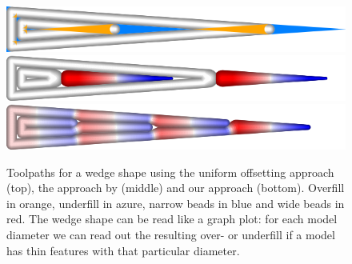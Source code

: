 \begin{figure}\centering
\includegraphics[width=\columnwidth]{sources-intro-TEST-naive-accuracy.png}
\includegraphics[width=\columnwidth]{sources-intro-TEST-Center-widths.png}
\includegraphics[width=\columnwidth]{sources-intro-TEST-InwardDistributed-widths.png}
\caption{
Toolpaths for a wedge shape using the uniform offsetting approach (top), the approach by \citeauthor{Jin2017JMS}(middle) and our approach (bottom).
Overfill in orange, underfill in azure, narrow beads in blue and wide beads in red.
The wedge shape can be read like a graph plot: for each model diameter we can read out the resulting over- or underfill if a model has thin features with that particular diameter.
}
\label{intro_wedge}
\end{figure}




